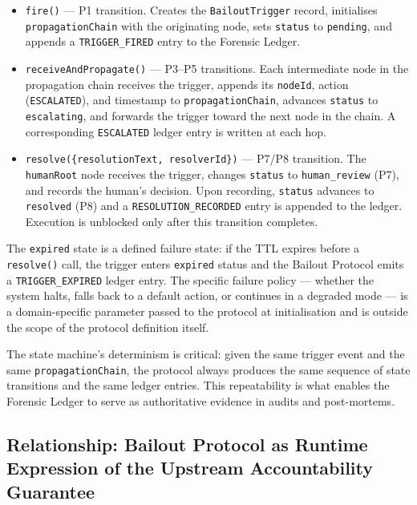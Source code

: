 \begin{itemize}
  \item \texttt{fire()} — P1 transition.  Creates the \texttt{BailoutTrigger} record,
        initialises \texttt{propagationChain} with the originating node, sets
        \texttt{status} to \texttt{pending}, and appends a \texttt{TRIGGER\_FIRED}
        entry to the Forensic Ledger.

  \item \texttt{receiveAndPropagate()} — P3–P5 transitions.  Each intermediate node
        in the propagation chain receives the trigger, appends its \texttt{nodeId},
        action (\texttt{ESCALATED}), and timestamp to \texttt{propagationChain},
        advances \texttt{status} to \texttt{escalating}, and forwards the trigger
        toward the next node in the chain.  A corresponding \texttt{ESCALATED}
        ledger entry is written at each hop.

  \item \texttt{resolve(\{resolutionText, resolverId\})} — P7/P8 transition.
        The \texttt{humanRoot} node receives the trigger, changes \texttt{status}
        to \texttt{human\_review} (P7), and records the human's decision.
        Upon recording, \texttt{status} advances to \texttt{resolved} (P8) and a
        \texttt{RESOLUTION\_RECORDED} entry is appended to the ledger.
        Execution is unblocked only after this transition completes.
\end{itemize}

The \texttt{expired} state is a defined failure state: if the TTL expires before
a \texttt{resolve()} call, the trigger enters \texttt{expired} status and the
Bailout Protocol emits a \texttt{TRIGGER\_EXPIRED} ledger entry.  The specific
failure policy — whether the system halts, falls back to a default action, or
continues in a degraded mode — is a domain-specific parameter passed to the
protocol at initialisation and is outside the scope of the protocol definition
itself.

The state machine's determinism is critical: given the same trigger event and the
same \texttt{propagationChain}, the protocol always produces the same sequence of
state transitions and the same ledger entries.  This repeatability is what enables
the Forensic Ledger to serve as authoritative evidence in audits and post-mortems.

\subsection{Relationship: Bailout Protocol as Runtime Expression of
            the Upstream Accountability Guarantee}

